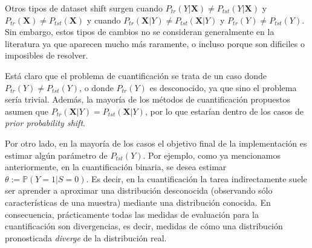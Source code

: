 Otros tipos de dataset shift surgen cuando $P_{tr}(Y|\mathbf{X}) \neq
P_{tst}(Y|\mathbf{X})$ y $P_{tr}(\mathbf{X}) \neq P_{tst}(\mathbf{X})$ y cuando
$P_{tr}(\mathbf{X}|Y) \neq P_{tst}(\mathbf{X}|Y)$ y $P_{tr}(Y) \neq P_{tst}(Y)$.
Sin embargo, estos tipos de cambios no se consideran generalmente en la
literatura ya que aparecen mucho más raramente, o incluso porque son dificiles o
imposibles de resolver.

Está claro que el problema de cuantificación se trata de un caso donde
$P_{tr}(Y) \neq P_{tst}(Y)$, o donde $P_{tr}(Y)$ es desconocido, ya que sino el
problema sería trivial. Además, la mayoría de los métodos de cuantificación
propuestos asumen que $P_{tr}(\mathbf{X}|Y) = P_{tst}(\mathbf{X}|Y)$, por lo que
estarían dentro de los casos de {\it prior probability shift}.

Por otro lado, en la mayoría de los casos el objetivo final de la implementación
es estimar algún parámetro de $P_{tst}(Y)$. Por ejemplo, como ya mencionamos
anteriormente, en la cuantificación binaria, se desea estimar $\theta:=
\mathbb{P}(Y=1|S=0)$. Es decir, en la cuantificación la tarea indirectamente
suele ser aprender a aproximar una distribución desconocida (observando sólo
características de una muestra) mediante una distribución conocida. En
consecuencia, prácticamente todas las medidas de evaluación para la
cuantificación son divergencias, es decir, medidas de cómo una distribución
pronosticada {\it diverge\/} de la distribución real.

